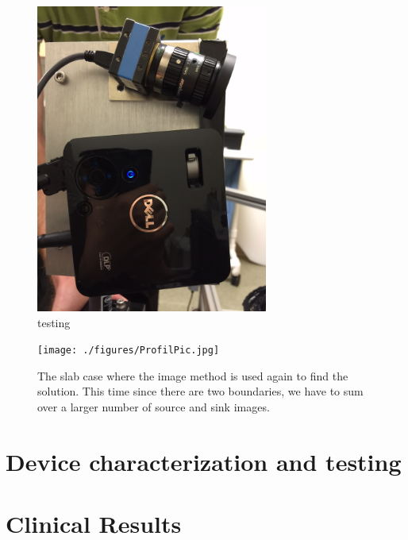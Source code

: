 \begin{figure}
\includegraphics[width = 3in]{./figures/4_Gen3/ProfilPic.jpg} 
\caption{testing}
\label{some example}
\end{figure}


\begin{figure}[htp]
\begin{center}
\texttt{[image: ./figures/ProfilPic.jpg]}
\caption{The slab case where the image method is used again to find  the solution. This time since there are two boundaries, we have to sum over a larger number of source and sink images.}
\label{slab}
\end{center}
\end{figure}


\section{Device characterization and testing}

\section{Clinical Results}